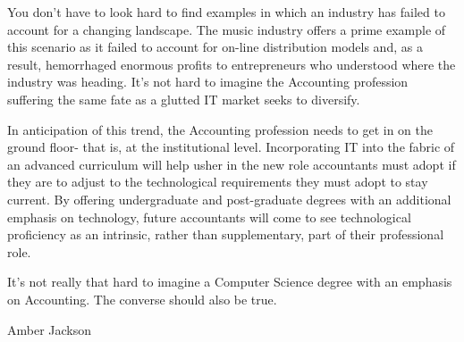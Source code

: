 \documentclass[letterpaper,11pt]{texMemo}
\begin{document}
 \setlength{\parskip}{12pt}
\maketitle
You don't have to look hard to find examples in which an industry has failed to account for a changing landscape.  The music industry offers a prime example of this scenario as it failed to account for on-line distribution models and, as a result, hemorrhaged enormous profits to entrepreneurs who understood where the industry was heading.  It's not hard to imagine the Accounting profession suffering the same fate as a glutted IT market seeks to diversify. 

In anticipation of this trend, the Accounting profession needs to get in on the ground floor- that is, at the institutional level.  Incorporating IT into the fabric of an advanced curriculum will help usher in the new role accountants must adopt if they are to adjust to the technological requirements they must adopt to stay current.  By offering undergraduate and post-graduate degrees with an additional emphasis on technology, future accountants will come to see technological proficiency as  an intrinsic, rather than supplementary, part of their professional role.  

It's not really that hard to imagine a Computer Science degree with an emphasis on Accounting.  The converse should also be true.

	



\hspace*{0.9in} Amber Jackson
\end{document}
